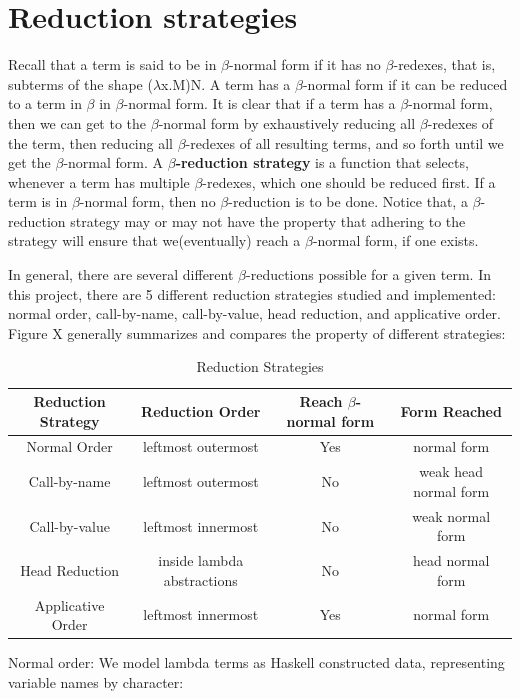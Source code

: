 \documentclass[a4paper,11pt,twoside]{report}
\begin{document}
\section{Reduction strategies}\label{sec:reductionstrategy}
\noindent Recall that a term is said to be in $\beta$-normal form if it has no $\beta$-redexes, that is, subterms of the shape ($\lambda$x.M)N. A term has a $\beta$-normal form if it can be reduced to a term in $\beta$ in $\beta$-normal form. It is clear that if a term has a $\beta$-normal form, then we can get to the $\beta$-normal form by exhaustively reducing all $\beta$-redexes of the term, then reducing all $\beta$-redexes of all resulting terms, and so forth until we get the $\beta$-normal form. A \textbf{$\beta$-reduction strategy} is a function that selects, whenever a term has multiple $\beta$-redexes, which one should be reduced first. If a term is in $\beta$-normal form, then no $\beta$-reduction is to be done. Notice that, a $\beta$-reduction strategy may or may not have the property that adhering to the strategy will ensure that we(eventually) reach a $\beta$-normal form, if one exists. 

In general, there are several different $\beta$-reductions possible for a given term. In this project, there are 5 different reduction strategies studied and implemented: normal order, call-by-name, call-by-value, head reduction, and applicative order. Figure X generally summarizes and compares the property of different strategies:
 
\begin{center}
\begin{table}[ht!]
\begin{tabular}{|c|c|c|c|}\hline
Reduction Strategy & Reduction Order & Reach $\beta$-normal form & Form Reached\\ \hline
Normal Order & leftmost outermost & Yes & normal form\\ \hline
Call-by-name & leftmost outermost & No  & weak head normal form\\ \hline
Call-by-value & leftmost innermost & No & weak normal form\\ \hline
Head Reduction & inside lambda abstractions & No & head normal form\\ \hline
Applicative Order & leftmost innermost & Yes & normal form\\ \hline
\end{tabular}
\caption{Reduction Strategies}
\end{table}
\end{center}
Normal order:
We model lambda terms as Haskell constructed data, representing variable names by character:
\end{document}
